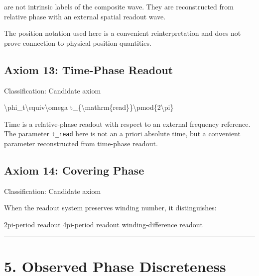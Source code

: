 \documentclass[
  a4paper,
]{article}
\newenvironment{Shaded}{}{}
\newcommand{\NormalTok}[1]{#1}
\begin{document}
are not intrinsic labels of the composite wave. They are reconstructed
from relative phase with an external spatial readout wave.

The position notation used here is a convenient reinterpretation and
does not prove connection to physical position quantities.

\subsection{Axiom 13: Time-Phase
Readout}\label{axiom-13-time-phase-readout}

Classification: Candidate axiom

\begin{Shaded}
\begin{Highlighting}[]
\NormalTok{\textbackslash{}phi\_t\textbackslash{}equiv\textbackslash{}omega t\_\{\textbackslash{}mathrm\{read\}\}\textbackslash{}pmod\{2\textbackslash{}pi\}}
\end{Highlighting}
\end{Shaded}

Time is a relative-phase readout with respect to an external frequency
reference. The parameter \texttt{t\_read} here is not an a priori
absolute time, but a convenient parameter reconstructed from time-phase
readout.

\subsection{Axiom 14: Covering Phase}\label{axiom-14-covering-phase}

Classification: Candidate axiom

When the readout system preserves winding number, it distinguishes:

\begin{Shaded}
\begin{Highlighting}[]
\NormalTok{2pi{-}period readout}
\NormalTok{4pi{-}period readout}
\NormalTok{winding{-}difference readout}
\end{Highlighting}
\end{Shaded}

\begin{center}\rule{0.5\linewidth}{0.5pt}\end{center}

\section{5. Observed Phase
Discreteness}\label{observed-phase-discreteness}
\end{document}
